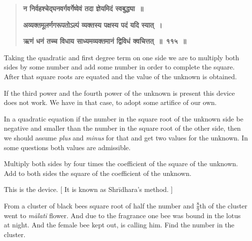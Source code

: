 \documentclass[]{article}
\begin{document}
{\begin{quote}
{{\textbf{{\color{purple}न निर्वहश्चेद्घनवर्गवर्गेष्वेवं तदा ज्ञेयमिदं स्वबुद्ध्या~॥ }}

\textbf{{\color{purple}अव्यक्तमूलर्णगरूपतोऽल्पं व्यक्तस्य पक्षस्य पदं यदि स्यात्~। }}

\textbf{{\color{purple}ऋणं धनं तच्च विधाय साध्यमव्यक्तमानं द्विविधं क्वचित्तत्~॥~११५~॥} }}
}  \end{quote}

{Taking the quadratic and first degree term on one side we are to
multiply both sides by some number and add some number in order to
complete the square. After that square roots are equated and the value
of the unknown is obtained.}

{If the third power and the fourth power of the unknown is present this
device does not work. We have in that case, to adopt some artifice of
our own.}

{In a quadratic equation if the number in the square root of the unknown
side be negative and smaller than the number in the square root of the
other side, then we should assume \textit{plus} and \textit{minus} for that and get two
values for the unknown. In some questions both values are admissible.}

\begin{quote}  {
}  \end{quote}

{Multiply both sides by four times the coefficient of the square of the
unknown. Add to both sides the square of the coefficient of the
unknown.\\
}
\newpage
\large

This is the device. [ It is known as Shrīdhara's method. ]

\begin{quote}  {
}  \end{quote}

From a cluster of black bees square root of half the number and $\frac{8}{9}$th
of the cluster went to \textit{mālatī} flower. And due to the fragrance one bee
was bound in the lotus at night. And the female bee kept out, is calling
him. Find the number in the cluster.

}
\end{document}
